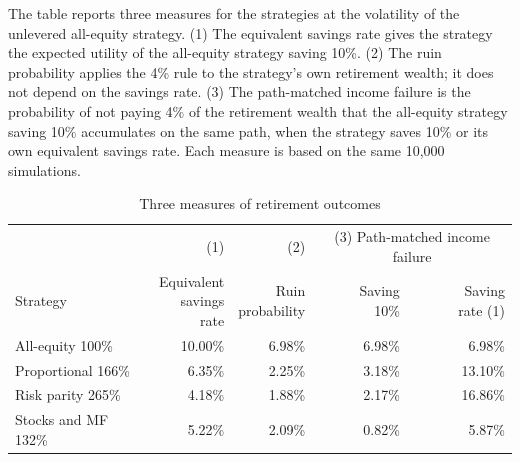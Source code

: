 \begin{table}[htbp]\centering
\caption{Three measures of retirement outcomes}\label{tab:measures}
\begin{minipage}{\linewidth}\small The table reports three measures for the strategies at the volatility of the unlevered all-equity strategy. (1) The equivalent savings rate gives the strategy the expected utility of the all-equity strategy saving 10\%. (2) The ruin probability applies the 4\% rule to the strategy's own retirement wealth; it does not depend on the savings rate. (3) The path-matched income failure is the probability of not paying 4\% of the retirement wealth that the all-equity strategy saving 10\% accumulates on the same path, when the strategy saves 10\% or its own equivalent savings rate. Each measure is based on the same 10,000 simulations.\end{minipage}
\medskip

{\small\setlength{\tabcolsep}{4pt}\begin{tabular}{lrrrr}\toprule
 & (1) & (2) & \multicolumn{2}{c}{(3) Path-matched income failure} \\ \cmidrule(lr){4-5}
Strategy & \shortstack{Equivalent\\ savings rate} & \shortstack{Ruin\\ probability} & \shortstack{Saving\\ 10\%} & \shortstack{Saving\\ rate (1)} \\ \midrule
All-equity 100\% & 10.00\% & 6.98\% & 6.98\% & 6.98\% \\
Proportional 166\% & 6.35\% & 2.25\% & 3.18\% & 13.10\% \\
Risk parity 265\% & 4.18\% & 1.88\% & 2.17\% & 16.86\% \\
Stocks and MF 132\% & 5.22\% & 2.09\% & 0.82\% & 5.87\% \\
\bottomrule\end{tabular}}
\end{table}
